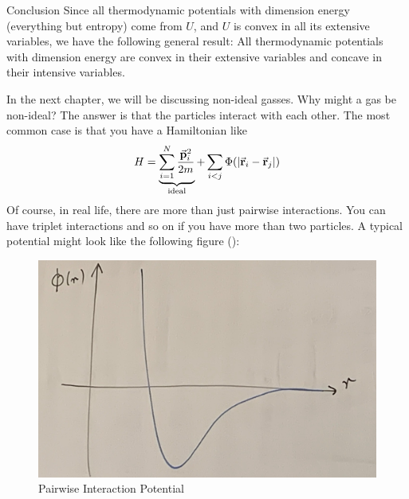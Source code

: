 \documentclass[a4paper,twoside,master.tex]{subfiles}
\begin{document}
\begin{note}{Conclusion}
    Since all thermodynamic potentials with dimension energy (everything but entropy) come from $ U $, and $ U $ is convex in all its extensive variables, we have the following general result: All thermodynamic potentials with dimension energy are convex in their extensive variables and concave in their intensive variables.
\end{note}

In the next chapter, we will be discussing non-ideal gasses. Why might a gas be non-ideal? The answer is that the particles interact with each other. The most common case is that you have a Hamiltonian like
\begin{equation}
    H = \underbrace{\sum_{i=1}^{N} \frac{\va{p}_i^2}{2m}}_{\text{ideal}} + \sum_{i<j} \Phi(\abs{\va{r}_i - \va{r}_j})
\end{equation}
Of course, in real life, there are more than just pairwise interactions. You can have triplet interactions and so on if you have more than two particles. A typical potential might look like the following figure ():


\begin{figure}[h]
    \centering
    \includegraphics[width=\textwidth]{figures/lec_20_pair_interaction.png}
    \caption{Pairwise Interaction Potential}
    \label{fig:lec_20_pairwise}
\end{figure}
\end{document}
